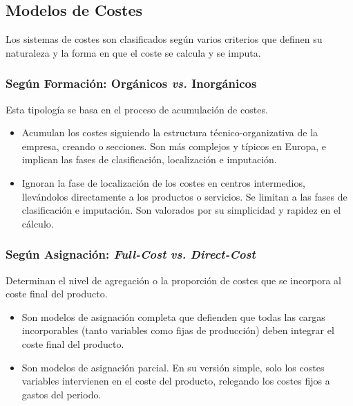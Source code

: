 \subsection{Modelos de Costes}

Los sistemas de costes son clasificados según varios criterios que definen su naturaleza y la forma en que el coste se calcula y se imputa.

\subsubsection{Según Formación: Orgánicos \textit{vs.} Inorgánicos}

Esta tipología se basa en el proceso de acumulación de costes.

\begin{itemize}
    \item {} Acumulan los costes siguiendo la estructura técnico-organizativa de la empresa, creando  o secciones. Son más complejos y típicos en Europa, e implican las fases de clasificación, localización e imputación.
    \item {} Ignoran la fase de localización de los costes en centros intermedios, llevándolos directamente a los productos o servicios. Se limitan a las fases de clasificación e imputación. Son valorados por su simplicidad y rapidez en el cálculo.
\end{itemize}

\subsubsection{Según Asignación: \textit{Full-Cost} \textit{vs.} \textit{Direct-Cost}}

Determinan el nivel de agregación o la proporción de costes que se incorpora al coste final del producto.

\begin{itemize}
    \item {} Son modelos de asignación completa que defienden que todas las cargas incorporables (tanto variables como fijas de producción) deben integrar el coste final del producto.
    \item {} Son modelos de asignación parcial. En su versión simple, solo los costes variables intervienen en el coste del producto, relegando los costes fijos a gastos del periodo.
\end{itemize}

